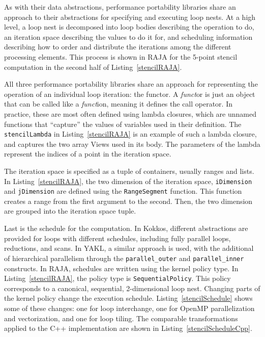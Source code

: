 As with their data abstractions, performance portability libraries share an approach to their abstractions for specifying and executing loop nests.
At a high level, a loop nest is decomposed into loop bodies describing the operation to do, an iteration space describing the values to do it for, and scheduling information describing how to order and distribute the iterations among the different processing elements.
This process is shown in RAJA for the 5-point stencil computation in the second half of Listing~\ref{stencilRAJA}.

All three performance portability libraries share an approach for representing the operation of an individual loop iteration: the functor.
A \textit{funct}or is just an object that can be called like a \textit{funct}ion, meaning it defines the call operator. 
In practice, these are most often defined using lambda closures, which are unnamed functions that ``capture'' the values of variables used in their definition.
The \verb.stencilLambda. in Listing~\ref{stencilRAJA} is an example of such a lambda closure, and captures the two array Views used in its body.
The parameters of the lambda represent the indices of a point in the iteration space.

The iteration space is specified as a tuple of containers, usually ranges and lists.
In Listing~\ref{stencilRAJA}, the two dimension of the iteration space, \verb.iDimension. and \verb.jDimension. are defined using the \verb.RangeSegment. function.
This function creates a range from the first argument to the second.
Then, the two dimension are grouped into the iteration space tuple.

Last is the schedule for the computation.
In Kokkos, different abstractions are provided for loops with different schedules, including fully parallel loops, reductions, and scans.
In YAKL, a similar approach is used, with the additional of hierarchical parallelism through the \verb.parallel_outer. and \verb.parallel_inner. constructs.
In RAJA, schedules are written using the kernel policy type.
In Listing~\ref{stencilRAJA}, the policy type is \verb.SequentialPolicy..
This policy corresponds to a canonical, sequential, 2-dimensional loop nest.
Changing parts of the kernel policy change the execution schedule.  %
Listing~\ref{stencilSchedule} shows some of these changes: one for loop interchange, one for OpenMP parallelization and vectorization, and one for loop tiling.
The comparable transformations applied to the C++ implementation are shown in Listing~\ref{stencilScheduleCpp}.

